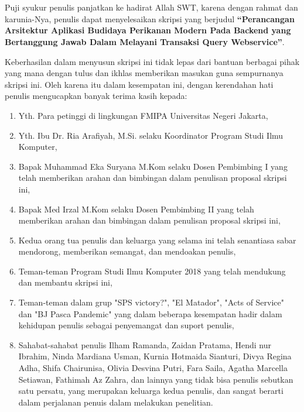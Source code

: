 \chapter*{}

Puji syukur penulis panjatkan ke hadirat Allah SWT, karena dengan rahmat dan karunia-Nya, penulis dapat menyelesaikan skripsi yang berjudul \textbf{“Perancangan Arsitektur Aplikasi Budidaya Perikanan Modern Pada Backend yang Bertanggung Jawab Dalam Melayani Transaksi Query Webservice”}.

Keberhasilan dalam menyusun skripsi ini tidak lepas dari bantuan berbagai pihak yang mana dengan tulus dan ikhlas memberikan masukan guna sempurnanya skripsi ini. Oleh karena itu dalam kesempatan ini, dengan kerendahan hati penulis mengucapkan banyak terima kasih kepada:

\begin{enumerate}

	\item{Yth. Para petinggi di lingkungan FMIPA Universitas Negeri Jakarta,}
	\item{Yth. Ibu Dr. Ria Arafiyah, M.Si. selaku Koordinator Program Studi Ilmu Komputer,}
	\item {Bapak Muhammad Eka Suryana M.Kom selaku Dosen Pembimbing I yang telah memberikan arahan dan bimbingan dalam penulisan proposal skripsi ini,}
	\item {Bapak Med Irzal M.Kom selaku Dosen Pembimbing II yang telah memberikan arahan dan bimbingan dalam penulisan proposal skripsi ini,}
	\item{Kedua orang tua penulis dan keluarga yang selama ini telah senantiasa sabar
mendorong, memberikan semangat, dan mendoakan penulis,}
	\item{Teman-teman Program Studi Ilmu Komputer 2018 yang telah mendukung dan membantu skripsi ini,}
	\item{Teman-teman dalam grup "SPS victory?", "El Matador", "Acts of Service" dan "BJ Pasca Pandemic" yang dalam beberapa kesempatan hadir dalam kehidupan penulis sebagai penyemangat dan suport penulis,}
	\item{Sahabat-sahabat penulis Ilham Ramanda, Zaidan Pratama, Hendi nur Ibrahim, Ninda Mardiana Usman, Kurnia Hotmaida Sianturi, Divya Regina Adha, Shifa Chairunisa, Olivia Desvina Putri, Fara Saila, Agatha Marcella Setiawan, Fathimah Az Zahra, dan lainnya yang tidak bisa penulis sebutkan satu persatu, yang merupakan keluarga kedua penulis, dan sangat berarti dalam perjalanan penuis dalam melakukan penelitian.}
	
\end{enumerate}

